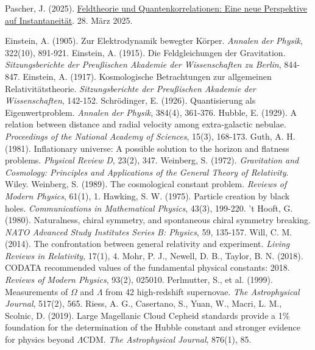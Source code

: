 \documentclass[12pt,a4paper]{article}
\begin{document}
\begin{thebibliography}{99}
		 Pascher, J. (2025). \href{https://github.com/jpascher/T0-Time-Mass-Duality/tree/main/2/pdf/Deutsch/FeldtheorieQuanten.pdf}{Feldtheorie und Quantenkorrelationen: Eine neue Perspektive auf Instantaneität}. 28. März 2025.
		
		 Einstein, A. (1905). Zur Elektrodynamik bewegter Körper. \textit{Annalen der Physik}, 322(10), 891-921.
		 Einstein, A. (1915). Die Feldgleichungen der Gravitation. \textit{Sitzungsberichte der Preußischen Akademie der Wissenschaften zu Berlin}, 844-847.
		 Einstein, A. (1917). Kosmologische Betrachtungen zur allgemeinen Relativitätstheorie. \textit{Sitzungsberichte der Preußischen Akademie der Wissenschaften}, 142-152.
		 Schrödinger, E. (1926). Quantisierung als Eigenwertproblem. \textit{Annalen der Physik}, 384(4), 361-376.
		 Hubble, E. (1929). A relation between distance and radial velocity among extra-galactic nebulae. \textit{Proceedings of the National Academy of Sciences}, 15(3), 168-173.
		 Guth, A. H. (1981). Inflationary universe: A possible solution to the horizon and flatness problems. \textit{Physical Review D}, 23(2), 347.
		 Weinberg, S. (1972). \textit{Gravitation and Cosmology: Principles and Applications of the General Theory of Relativity}. Wiley.
		 Weinberg, S. (1989). The cosmological constant problem. \textit{Reviews of Modern Physics}, 61(1), 1.
		 Hawking, S. W. (1975). Particle creation by black holes. \textit{Communications in Mathematical Physics}, 43(3), 199-220.
		 't Hooft, G. (1980). Naturalness, chiral symmetry, and spontaneous chiral symmetry breaking. \textit{NATO Advanced Study Institutes Series B: Physics}, 59, 135-157.
		 Will, C. M. (2014). The confrontation between general relativity and experiment. \textit{Living Reviews in Relativity}, 17(1), 4.
		 Mohr, P. J., Newell, D. B., Taylor, B. N. (2018). CODATA recommended values of the fundamental physical constants: 2018. \textit{Reviews of Modern Physics}, 93(2), 025010.
		 Perlmutter, S., et al. (1999). Measurements of $\Omega$ and $\Lambda$ from 42 high-redshift supernovae. \textit{The Astrophysical Journal}, 517(2), 565.
		 Riess, A. G., Casertano, S., Yuan, W., Macri, L. M., Scolnic, D. (2019). Large Magellanic Cloud Cepheid standards provide a 1\% foundation for the determination of the Hubble constant and stronger evidence for physics beyond $\Lambda$CDM. \textit{The Astrophysical Journal}, 876(1), 85.

\end{thebibliography}
\end{document}
